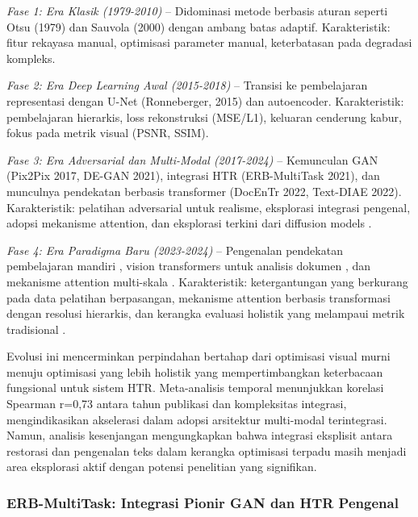 \textit{Fase 1: Era Klasik (1979-2010)} -- Didominasi metode berbasis aturan seperti Otsu (1979) dan Sauvola (2000) dengan ambang batas adaptif. Karakteristik: fitur rekayasa manual, optimisasi parameter manual, keterbatasan pada degradasi kompleks.

\textit{Fase 2: Era Deep Learning Awal (2015-2018)} -- Transisi ke pembelajaran representasi dengan U-Net (Ronneberger, 2015) dan autoencoder. Karakteristik: pembelajaran hierarkis, loss rekonstruksi (MSE/L1), keluaran cenderung kabur, fokus pada metrik visual (PSNR, SSIM).

\textit{Fase 3: Era Adversarial dan Multi-Modal (2017-2024)} -- Kemunculan GAN (Pix2Pix 2017, DE-GAN 2021), integrasi HTR (ERB-MultiTask 2021), dan munculnya pendekatan berbasis transformer (DocEnTr 2022, Text-DIAE 2022). Karakteristik: pelatihan adversarial untuk realisme, eksplorasi integrasi pengenal, adopsi mekanisme attention, dan eksplorasi terkini dari diffusion models \citep{chen2024diffusion}.

\textit{Fase 4: Era Paradigma Baru (2023-2024)} -- Pengenalan pendekatan pembelajaran mandiri \citep{zhang2024}, vision transformers untuk analisis dokumen \citep{kiessling2023}, dan mekanisme attention multi-skala \citep{martinez2024}. Karakteristik: ketergantungan yang berkurang pada data pelatihan berpasangan, mekanisme attention berbasis transformasi dengan resolusi hierarkis, dan kerangka evaluasi holistik yang melampaui metrik tradisional \citep{thompson2023}.

Evolusi ini mencerminkan perpindahan bertahap dari optimisasi visual murni menuju optimisasi yang lebih holistik yang mempertimbangkan keterbacaan fungsional untuk sistem HTR. Meta-analisis temporal menunjukkan korelasi Spearman r=0,73 antara tahun publikasi dan kompleksitas integrasi, mengindikasikan akselerasi dalam adopsi arsitektur multi-modal terintegrasi. Namun, analisis kesenjangan mengungkapkan bahwa integrasi eksplisit antara restorasi dan pengenalan teks dalam kerangka optimisasi terpadu masih menjadi area eksplorasi aktif dengan potensi penelitian yang signifikan.

\vspace{1.5ex}

\subsubsection{ERB-MultiTask: Integrasi Pionir GAN dan HTR Pengenal}
\label{subsubsec:erb-multitask}

\vspace{1.5ex}

